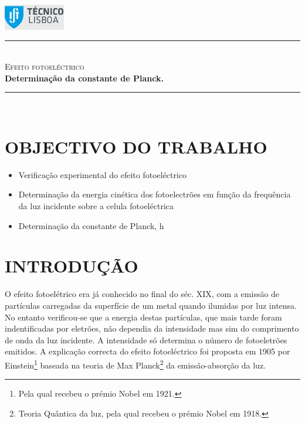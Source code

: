 \documentclass[a4paper,12pt]{article}  %
\author{Prof. Bernardo B. Carvalho}
\date{ Outubro 2014}
\newcommand{\HRule}{\rule{\linewidth}{0.5mm}}
\begin{document}
 

	\includegraphics[width=0.2\textwidth]{../logo-ist}%

	\HRule \\[0.5cm]
	{ \huge \sf  \textsc{Efeito fotoeléctrico}} \\[0.4cm] %
	{ \large \bfseries Determinação da constante de Planck.}\\
	\HRule \\%

\section{\sf OBJECTIVO DO TRABALHO}
\begin{itemize}
\item Verificação experimental do efeito fotoeléctrico
\item Determinação da energia cinética dos fotoelectrões em função da frequência da luz incidente sobre a celula fotoeléctrica
\item  Determinação da constante de Planck, h
\end{itemize}


\section{\sf INTRODUÇÃO }
O efeito fotoelétrico era já conhecido no final do séc. XIX, com a emissão  de partículas carregadas da superfície de um metal quando ilumidas por luz intensa. No entanto  verificou-se que a energia destas partículas, que mais tarde foram indentificadas por eletrões, não dependia da intensidade mas sim do comprimento de onda da  luz incidente. A intensidade só determina o número de fotoeletrões emitidos. A explicação correcta do efeito fotoeléctrico foi proposta em 1905 por Einstein\footnote{Pela qual recebeu o prémio Nobel em 1921.} baseada na teoria de Max Planck\footnote{Teoria Quântica da luz, pela qual recebeu o prémio Nobel em 1918.} da emissão-absorção da luz. 
\end{document}

